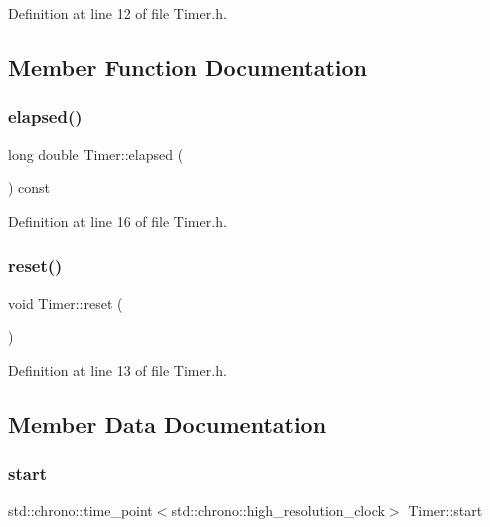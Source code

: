 Definition at line 12 of file Timer.\+h.



\subsection{Member Function Documentation}
\mbox{\label{class_timer_a4448fdb80f00982236dd8db16bf50fea}} 
\subsubsection{\texorpdfstring{elapsed()}{elapsed()}}
{\footnotesize\ttfamily long double Timer\+::elapsed (\begin{DoxyParamCaption}{ }\end{DoxyParamCaption}) const\hspace{0.3cm}{\ttfamily [inline]}}



Definition at line 16 of file Timer.\+h.

\mbox{\label{class_timer_a9020542d73357a4eef512eefaf57524b}} 
\subsubsection{\texorpdfstring{reset()}{reset()}}
{\footnotesize\ttfamily void Timer\+::reset (\begin{DoxyParamCaption}{ }\end{DoxyParamCaption})\hspace{0.3cm}{\ttfamily [inline]}}



Definition at line 13 of file Timer.\+h.



\subsection{Member Data Documentation}
\mbox{\label{class_timer_a8a51b74f2bfb71a5ec527d8954ed57d9}} 
\subsubsection{\texorpdfstring{start}{start}}
{\footnotesize\ttfamily std\+::chrono\+::time\+\_\+point$<$std\+::chrono\+::high\+\_\+resolution\+\_\+clock$>$ Timer\+::start\hspace{0.3cm}{\ttfamily [private]}}



